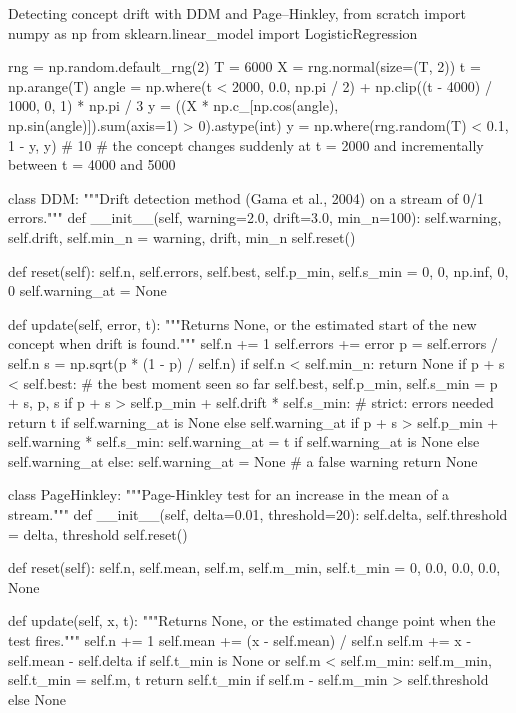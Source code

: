 \begin{pylisting}[label={lst:conceptdrift}]{Detecting concept drift with DDM and Page--Hinkley, from scratch}
import numpy as np
from sklearn.linear_model import LogisticRegression

rng = np.random.default_rng(2)
T = 6000
X = rng.normal(size=(T, 2))
t = np.arange(T)
angle = np.where(t < 2000, 0.0, np.pi / 2) + np.clip((t - 4000) / 1000, 0, 1) * np.pi / 3
y = ((X * np.c_[np.cos(angle), np.sin(angle)]).sum(axis=1) > 0).astype(int)
y = np.where(rng.random(T) < 0.1, 1 - y, y)       # 10%
# the concept changes suddenly at t = 2000 and incrementally between t = 4000 and 5000

class DDM:
    """Drift detection method (Gama et al., 2004) on a stream of 0/1 errors."""
    def __init__(self, warning=2.0, drift=3.0, min_n=100):
        self.warning, self.drift, self.min_n = warning, drift, min_n
        self.reset()

    def reset(self):
        self.n, self.errors, self.best, self.p_min, self.s_min = 0, 0, np.inf, 0, 0
        self.warning_at = None

    def update(self, error, t):
        """Returns None, or the estimated start of the new concept when drift is found."""
        self.n += 1
        self.errors += error
        p = self.errors / self.n
        s = np.sqrt(p * (1 - p) / self.n)
        if self.n < self.min_n:
            return None
        if p + s < self.best:                       # the best moment seen so far
            self.best, self.p_min, self.s_min = p + s, p, s
        if p + s > self.p_min + self.drift * self.s_min:      # strict: errors needed
            return t if self.warning_at is None else self.warning_at
        if p + s > self.p_min + self.warning * self.s_min:
            self.warning_at = t if self.warning_at is None else self.warning_at
        else:
            self.warning_at = None                  # a false warning
        return None

class PageHinkley:
    """Page-Hinkley test for an increase in the mean of a stream."""
    def __init__(self, delta=0.01, threshold=20):
        self.delta, self.threshold = delta, threshold
        self.reset()

    def reset(self):
        self.n, self.mean, self.m, self.m_min, self.t_min = 0, 0.0, 0.0, 0.0, None

    def update(self, x, t):
        """Returns None, or the estimated change point when the test fires."""
        self.n += 1
        self.mean += (x - self.mean) / self.n
        self.m += x - self.mean - self.delta
        if self.t_min is None or self.m < self.m_min:
            self.m_min, self.t_min = self.m, t
        return self.t_min if self.m - self.m_min > self.threshold else None


\end{pylisting}
